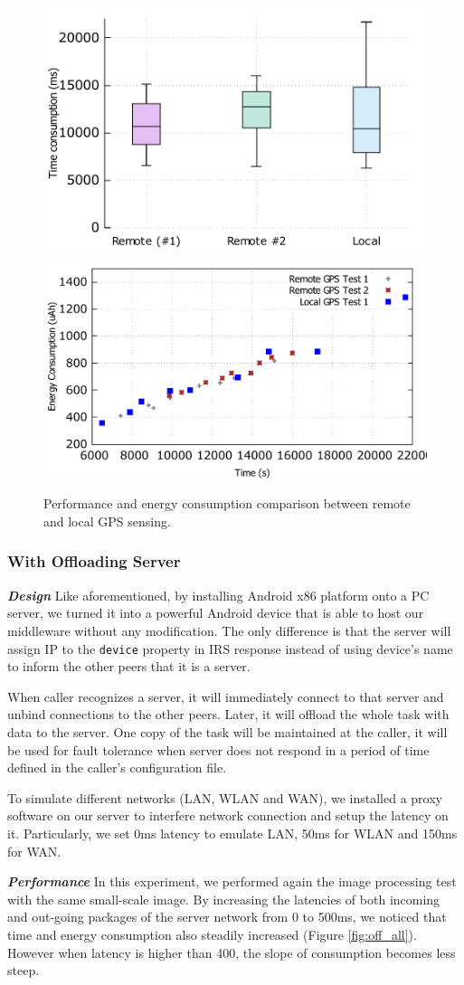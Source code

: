\documentclass{sig-alternate}
\begin{document}
\begin{figure}
	\centering
		\includegraphics[width=.42\textwidth]{data/gps_perf.pdf}
		\includegraphics[width=.47\textwidth]{data/gps_energy_full.pdf}
	\caption{Performance and energy consumption comparison between remote and local GPS sensing.}
	\label{fig:gps_perf}
\end{figure}

\subsubsection{With Offloading Server}

\textbf{\emph{Design}}
Like aforementioned, by installing Android x86 platform onto a PC server, we turned it into a powerful Android device that is able to host our middleware without any modification. The only difference is that the server will assign IP to the \texttt{device} property in IRS response instead of using device's name to inform the other peers that it is a server. 

When caller recognizes a server, it will immediately connect to that server and unbind connections to the other peers. Later, it will offload the whole task with data to the server. One copy of the task will be maintained at the caller, it will be used for fault tolerance when server does not respond in a period of time defined in the caller's configuration file.

To simulate different networks (LAN, WLAN and WAN), we installed a proxy software on our server to interfere network connection and setup the latency on it. Particularly, we set 0ms latency to emulate LAN, 50ms for WLAN and 150ms for WAN.

\textbf{\emph{Performance}}
In this experiment, we performed again the image processing test with the same small-scale image. By increasing the latencies of both incoming and out-going packages of the server network from 0 to 500ms, we noticed that time and energy consumption also steadily increased (Figure \ref{fig:off_all}). However when latency is higher than 400, the slope of consumption becomes less steep.
\end{document}
